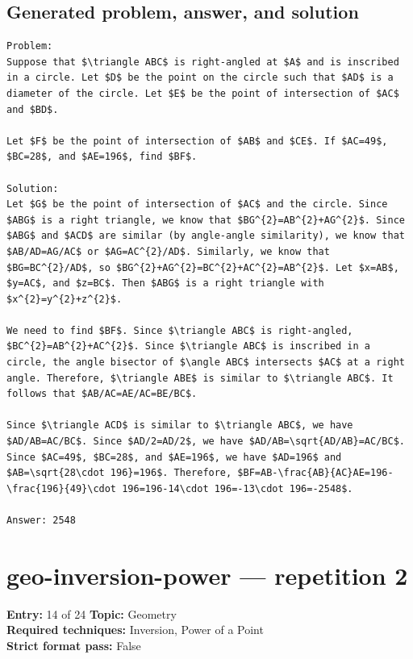 \documentclass[11pt]{article}
\begin{document}
\subsection*{Generated problem, answer, and solution}
\begin{lstlisting}[style=modeloutput]
Problem:
Suppose that $\triangle ABC$ is right-angled at $A$ and is inscribed in a circle. Let $D$ be the point on the circle such that $AD$ is a diameter of the circle. Let $E$ be the point of intersection of $AC$ and $BD$.

Let $F$ be the point of intersection of $AB$ and $CE$. If $AC=49$, $BC=28$, and $AE=196$, find $BF$.

Solution:
Let $G$ be the point of intersection of $AC$ and the circle. Since $ABG$ is a right triangle, we know that $BG^{2}=AB^{2}+AG^{2}$. Since $ABG$ and $ACD$ are similar (by angle-angle similarity), we know that $AB/AD=AG/AC$ or $AG=AC^{2}/AD$. Similarly, we know that $BG=BC^{2}/AD$, so $BG^{2}+AG^{2}=BC^{2}+AC^{2}=AB^{2}$. Let $x=AB$, $y=AC$, and $z=BC$. Then $ABG$ is a right triangle with $x^{2}=y^{2}+z^{2}$.

We need to find $BF$. Since $\triangle ABC$ is right-angled, $BC^{2}=AB^{2}+AC^{2}$. Since $\triangle ABC$ is inscribed in a circle, the angle bisector of $\angle ABC$ intersects $AC$ at a right angle. Therefore, $\triangle ABE$ is similar to $\triangle ABC$. It follows that $AB/AC=AE/AC=BE/BC$.

Since $\triangle ACD$ is similar to $\triangle ABC$, we have $AD/AB=AC/BC$. Since $AD/2=AD/2$, we have $AD/AB=\sqrt{AD/AB}=AC/BC$. Since $AC=49$, $BC=28$, and $AE=196$, we have $AD=196$ and $AB=\sqrt{28\cdot 196}=196$. Therefore, $BF=AB-\frac{AB}{AC}AE=196-\frac{196}{49}\cdot 196=196-14\cdot 196=-13\cdot 196=-2548$.

Answer: 2548
\end{lstlisting}
\clearpage
\section{geo-inversion-power --- repetition 2}
\begin{minipage}{\textwidth}
\color{metadata}\small\raggedright
\textbf{Entry:} 14 of 24\quad
\textbf{Topic:} Geometry\\[2pt]
\textbf{Required techniques:} Inversion, Power of a Point\\[2pt]
\textbf{Strict format pass:} False
\end{minipage}
\end{document}
